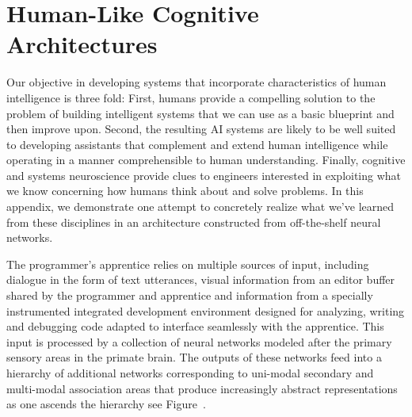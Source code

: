 
\section{Human-Like Cognitive Architectures}


Our objective in developing systems that incorporate characteristics of human intelligence is three fold: First, humans provide a compelling solution to the problem of building intelligent systems that we can use as a basic blueprint and then improve upon. Second, the resulting AI systems are likely to be well suited to developing assistants that complement and extend human intelligence while operating in a manner comprehensible to human understanding. Finally, cognitive and systems neuroscience provide clues to engineers interested in exploiting what we know concerning how humans think about and solve problems. In this appendix, we demonstrate one attempt to concretely realize what we've learned from these disciplines in an architecture constructed from off-the-shelf neural networks. 

The programmer's apprentice relies on multiple sources of input, including dialogue in the form of text utterances, visual information from an editor buffer shared by the programmer and apprentice and information from a specially instrumented integrated development environment designed for analyzing, writing and debugging code adapted to interface seamlessly with the apprentice. This input is processed by a collection of neural networks modeled after the primary sensory areas in the primate brain. The outputs of these networks feed into a hierarchy of additional networks corresponding to uni-modal secondary and multi-modal association areas that produce increasingly abstract representations as one ascends the hierarchy \emdash{} see Figure~{}.
  

\setcounter{figure}{49}


